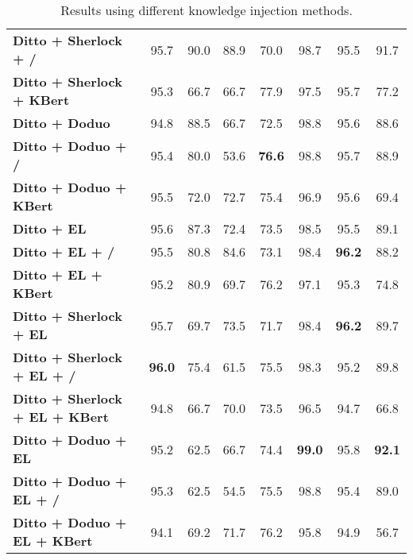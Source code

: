 \begin{table*}[!ht]
{\begin{tabular}{lccccccc}
\textbf{Ditto + Sherlock + /}          & 95.7             & 90.0             & 88.9          & 70.0          & 98.7          & 95.5          & 91.7             \\
\textbf{Ditto + Sherlock + KBert}      & 95.3             & 66.7             & 66.7          & 77.9          & 97.5          & 95.7          & 77.2             \\
\textbf{Ditto + Doduo}                 & 94.8             & 88.5             & 66.7          & 72.5          & 98.8          & 95.6          & 88.6             \\
\textbf{Ditto + Doduo + /}             & 95.4             & 80.0             & 53.6          & \textbf{76.6} & 98.8          & 95.7          & 88.9             \\
\textbf{Ditto + Doduo + KBert}         & 95.5             & 72.0             & 72.7          & 75.4          & 96.9          & 95.6          & 69.4             \\
\textbf{Ditto + EL}                    & 95.6             & 87.3             & 72.4          & 73.5          & 98.5          & 95.5          & 89.1             \\
\textbf{Ditto + EL + /}                & 95.5             & 80.8             & 84.6          & 73.1          & 98.4          & \textbf{96.2} & 88.2             \\
\textbf{Ditto + EL + KBert}            & 95.2             & 80.9             & 69.7          & 76.2          & 97.1          & 95.3          & 74.8             \\
\textbf{Ditto + Sherlock + EL}         & 95.7             & 69.7             & 73.5          & 71.7          & 98.4          & \textbf{96.2} & 89.7             \\
\textbf{Ditto + Sherlock + EL + /}     & \textbf{96.0}    & 75.4             & 61.5          & 75.5          & 98.3          & 95.2          & 89.8             \\
\textbf{Ditto + Sherlock + EL + KBert} & 94.8             & 66.7             & 70.0          & 73.5          & 96.5          & 94.7          & 66.8             \\
\textbf{Ditto + Doduo + EL}            & 95.2             & 62.5             & 66.7          & 74.4          & \textbf{99.0} & 95.8          & \textbf{92.1}    \\
\textbf{Ditto + Doduo + EL + /}        & 95.3             & 62.5             & 54.5          & 75.5          & 98.8          & 95.4          & 89.0             \\
\textbf{Ditto + Doduo + EL + KBert}    & 94.1             & 69.2             & 71.7          & 76.2          & 95.8          & 94.9          & 56.7             \\ \hline
\end{tabular}
}
\caption{Results using different knowledge injection methods.}
\label{tab:injection_results}
\end{table*}





